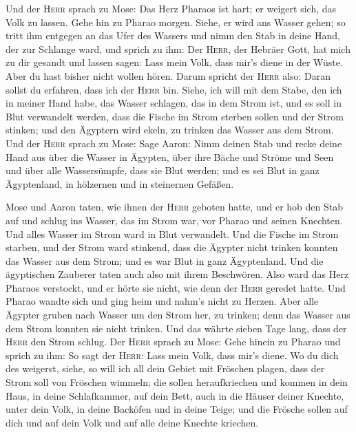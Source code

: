  Und der \textsc{Herr} sprach zu Mose: Das Herz Pharaos
ist hart; er weigert sich, das Volk zu lassen.  Gehe hin
zu Pharao morgen. Siehe, er wird ans Wasser gehen; so tritt ihm entgegen
an das Ufer des Wassers und nimm den Stab in deine Hand, der zur
Schlange ward,  und sprich zu ihm: Der \textsc{Herr}, der
Hebräer Gott, hat mich zu dir gesandt und lassen sagen: Lass mein Volk,
dass mir's diene in der Wüste. Aber du hast bisher nicht wollen hören.
 Darum spricht der \textsc{Herr} also: Daran sollst du
erfahren, dass ich der \textsc{Herr} bin. Siehe, ich will mit dem Stabe,
den ich in meiner Hand habe, das Wasser schlagen, das in dem Strom ist,
und es soll in Blut verwandelt werden,  dass die Fische
im Strom sterben sollen und der Strom stinken; und den Ägyptern wird
ekeln, zu trinken das Wasser aus dem Strom.  Und der
\textsc{Herr} sprach zu Mose: Sage Aaron: Nimm deinen Stab und recke
deine Hand aus über die Wasser in Ägypten, über ihre Bäche und Ströme
und Seen und über alle Wassersümpfe, dass sie Blut werden; und es sei
Blut in ganz Ägyptenland, in hölzernen und in steinernen Gefäßen.

 Mose und Aaron taten, wie ihnen der \textsc{Herr}
geboten hatte, und er hob den Stab auf und schlug ins Wasser, das im
Strom war, vor Pharao und seinen Knechten. Und alles Wasser im Strom
ward in Blut verwandelt.  Und die Fische im Strom
starben, und der Strom ward stinkend, dass die Ägypter nicht trinken
konnten das Wasser aus dem Strom; und es war Blut in ganz Ägyptenland.
 Und die ägyptischen Zauberer taten auch also mit ihrem
Beschwören. Also ward das Herz Pharaos verstockt, und er hörte sie
nicht, wie denn der \textsc{Herr} geredet hatte.  Und
Pharao wandte sich und ging heim und nahm's nicht zu Herzen.
 Aber alle Ägypter gruben nach Wasser um den Strom her,
zu trinken; denn das Wasser aus dem Strom konnten sie nicht trinken.
 Und das währte sieben Tage lang, dass der \textsc{Herr}
den Strom schlug.  Der \textsc{Herr} sprach zu Mose: Gehe
hinein zu Pharao und sprich zu ihm: So sagt der \textsc{Herr}: Lass mein
Volk, dass mir's diene.  Wo du dich des weigerst, siehe,
so will ich all dein Gebiet mit Fröschen plagen,  dass
der Strom soll von Fröschen wimmeln; die sollen heraufkriechen und
kommen in dein Haus, in deine Schlafkammer, auf dein Bett, auch in die
Häuser deiner Knechte, unter dein Volk, in deine Backöfen und in deine
Teige;  und die Frösche sollen auf dich und auf dein Volk
und auf alle deine Knechte kriechen.

